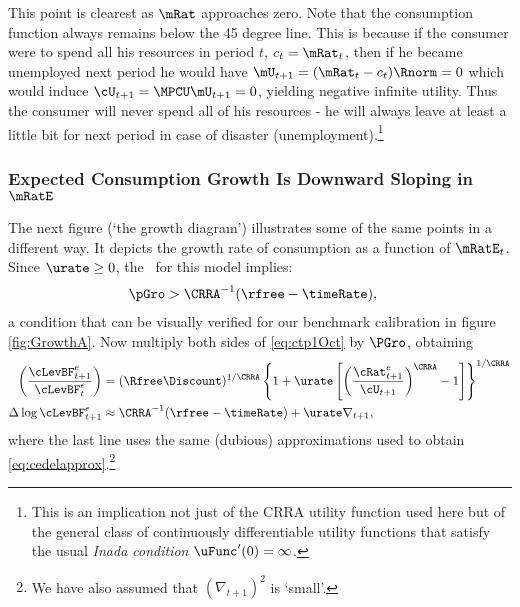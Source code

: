 \documentclass{\handout}
\begin{document}
This point is clearest as $\mRat$ approaches zero.  Note that the
consumption function always remains below the 45 degree line.  This
is because if the consumer were to spend all his resources in
period $t$, $c_{t}=\mRat_{t}$, then if he became unemployed next
period he would have $\mU_{t+1}=(\mRat_{t}-c_{t})\Rnorm=0$ which
would induce $\cU_{t+1}= \MPCU \mU_{t+1}=0$, yielding negative
infinite utility.  Thus the consumer will never spend all of his
resources - he will always leave at least a little bit for next period
in case of disaster (unemployment).\footnote{This is an implication not just
of the CRRA utility function used here but of the general class of continuously differentiable utility
functions that satisfy the usual {\it Inada condition} $\uFunc^{\prime}(0) = \infty$.}

\subsubsection{Expected Consumption Growth Is Downward Sloping in $\mRatE$}
The next figure (`the growth diagram') illustrates some of the same points in a different
way.  It depicts the growth rate of consumption as a function of $\mRatE_{t}$.
Since $\urate \geq 0$, the \GICPGro~for this model
implies:
\begin{equation}\begin{gathered}\begin{aligned}
  \pGro & >  \CRRA^{-1}(\rfree-\timeRate) ,
\end{aligned}\end{gathered}\end{equation}
a condition that can be visually verified for our benchmark calibration in figure \ref{fig:GrowthA}.  Now multiply both sides of \eqref{eq:ctp1Oct} by $\PGro$, obtaining
\begin{equation}\begin{gathered}\begin{aligned}
        \left(\frac{\cLevBF^{e}_{t+1}}{\cLevBF^{e}_{t}}\right) & =  (\Rfree\Discount)^{1/\CRRA} \left\{1+\urate\left[\left(\frac{{\cRat}^{e}_{t+1}}{\cU_{t+1}}\right)^{\CRRA}-1\right]\right\}^{1/\CRRA} \label{eq:cLevGro}
\\       \Delta \log \cLevBF^{e}_{t+1} & \approx  \CRRA^{-1}(\rfree-\timeRate) +  \urate \nabla _{t+1}, %
\end{aligned}\end{gathered}\end{equation}
where the last line uses the same (dubious) approximations used to obtain
\eqref{eq:cedelapprox}.\footnote{We have also assumed that $(\nabla _{t+1})^{2}$ is `small'.}
\end{document}
